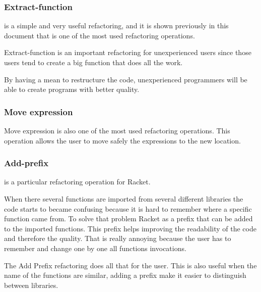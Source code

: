 \subsubsection{Extract-function}

is a simple and very useful refactoring, and it is shown previously in this document that is one of the most used refactoring operations.

Extract-function is an important refactoring for unexperienced users since those users tend to create a big function that does all the work.

By having a mean to restructure the code, unexperienced programmers will be able to create programs with better quality.




\subsubsection{Move expression}

Move expression is also one of the most used refactoring operations.
This operation allows the user to move safely the expressions to the new location.



\subsubsection{Add-prefix}
is a particular refactoring operation for Racket.

When there several functions are imported from several different libraries the code starts to became confusing because it is hard to remember where a specific function came from.
To solve that problem Racket as a prefix that can be added to the imported functions.
This prefix helps improving the readability of the code and therefore the quality.
That is really annoying because the user has to remember and change one by one all functions invocations.

The Add Prefix refactoring does all that for the user.
This is also useful when the name of the functions are similar, adding a prefix make it easier to distinguish between libraries.





